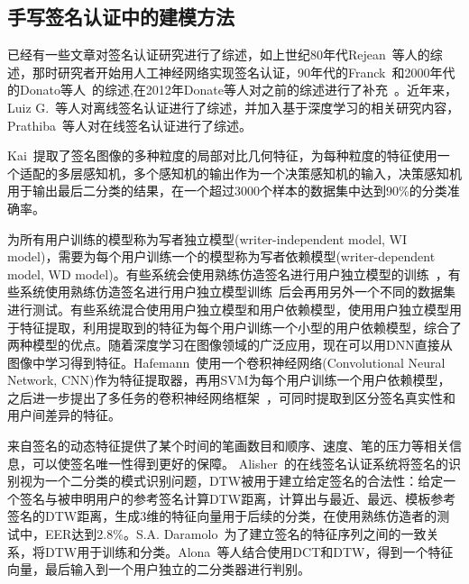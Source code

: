 \subsection{手写签名认证中的建模方法}

已经有一些文章对签名认证研究进行了综述，如上世纪80年代Rejean~\cite{plamondon1989automatic}等人的综述，那时研究者开始用人工神经网络实现签名认证，90年代的Franck~\cite{leclerc1994automatic}和2000年代的Donato等人~\cite{impedovo2008automatic}的综述,在2012年Donate等人对之前的综述进行了补充~\cite{impedovo2012handwritten}。近年来，Luiz G.~\cite{hafemann2017offline}等人对离线签名认证进行了综述，并加入基于深度学习的相关研究内容，Prathiba~\cite{prathiba2014online}等人对在线签名认证进行了综述。

Kai~\cite{huang1997off}提取了签名图像的多种粒度的局部对比几何特征，为每种粒度的特征使用一个适配的多层感知机，多个感知机的输出作为一个决策感知机的输入，决策感知机用于输出最后二分类的结果，在一个超过3000个样本的数据集中达到90\%的分类准确率。

为所有用户训练的模型称为写者独立模型(writer-independent model, WI model)，需要为每个用户训练一个的模型称为写者依赖模型(writer-dependent model, WD model)。有些系统会使用熟练仿造签名进行用户独立模型的训练~\cite{rivard2013multi,eskander2013hybrid}，有些系统使用熟练仿造签名进行用户独立模型训练~\cite{yilmaz2016score,rantzsch2016signature,hafemann2017learning}后会再用另外一个不同的数据集进行测试。有些系统混合使用用户独立模型和用户依赖模型，使用用户独立模型用于特征提取，利用提取到的特征为每个用户训练一个小型的用户依赖模型，综合了两种模型的优点。随着深度学习在图像领域的广泛应用，现在可以用DNN直接从图像中学习得到特征。Hafemann~\cite{hafemann2016writer}使用一个卷积神经网络(Convolutional Neural Network, CNN)作为特征提取器，再用SVM为每个用户训练一个用户依赖模型，之后进一步提出了多任务的卷积神经网络框架~\cite{hafemann2017learning}，可同时提取到区分签名真实性和用户间差异的特征。

来自签名的动态特征提供了某个时间的笔画数目和顺序、速度、笔的压力等相关信息，可以使签名唯一性得到更好的保障。 Alisher~\cite{kholmatov2005identity}的在线签名认证系统将签名的识别视为一个二分类的模式识别问题，DTW被用于建立给定签名的合法性：给定一个签名与被申明用户的参考签名计算DTW距离，计算出与最近、最远、模板参考签名的DTW距离，生成3维的特征向量用于后续的分类，在使用熟练仿造者的测试中，EER达到2.8\%。S.A. Daramolo~\cite{daramola2010efficient}为了建立签名的特征序列之间的一致关系，将DTW用于训练和分类。Alona~\cite{levy2018handwritten}等人结合使用DCT和DTW，得到一个特征向量，最后输入到一个用户独立的二分类器进行判别。

